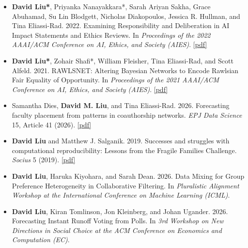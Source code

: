 \documentclass[margin]{res}
\begin{document}
\begin{resume}
\begin{itemize}
\item[]
\textbf{David Liu*}, Priyanka Nanayakkara*, Sarah Ariyan Sakha, Grace Abuhamad, Su Lin Blodgett, Nicholas Diakopoulos, Jessica R. Hullman, and Tina Eliassi-Rad. 2022. Examining Responsibility and Deliberation in AI Impact Statements and Ethics Reviews. In \textit{Proceedings of the 2022 AAAI/ACM Conference on AI, Ethics, and Society (AIES)}. \href{https://dl.acm.org/doi/10.1145/3514094.3534155}{[pdf]}
\item[] 
\textbf{David Liu*}, Zohair Shafi*, William Fleisher, Tina Eliassi-Rad, and Scott Alfeld. 2021. RAWLSNET: Altering Bayesian Networks to Encode Rawlsian Fair Equality of Opportunity. In \textit{Proceedings of the 2021 AAAI/ACM Conference on AI, Ethics, and Society (AIES)}. \href{https://doi.org/10.1145/3461702.3462618}{[pdf]}
\end{itemize}

\begin{itemize}
\section{Journal\\Papers}
\setlength{\itemsep}{14pt}
\setlength{\parsep}{0pt}
\item[]
Samantha Dies, \textbf{David M. Liu}, and Tina Eliassi-Rad. 2026. Forecasting faculty placement from patterns in coauthorship networks. \textit{EPJ Data Science} 15, Article 41 (2026). \href{https://arxiv.org/pdf/2507.14696}{[pdf]}
\item[]
\textbf{David Liu} and Matthew J. Salganik. 2019. Successes and struggles with computational reproducibility: Lessons from the Fragile Families Challenge. \textit{Socius} 5 (2019).  \href{https://doi.org/10.1177/2378023119849803}{[pdf]}
\end{itemize}

\begin{itemize}
\section{Workshop\\Papers}
\setlength{\itemsep}{14pt}
\setlength{\parsep}{0pt}
\item[]
\textbf{David Liu}, Haruka Kiyohara, and Sarah Dean. 2026. Data Mixing for Group Preference Heterogeneity in Collaborative Filtering. In \textit{Pluralistic Alignment Workshop at the International Conference on Machine Learning (ICML)}.
\item[]
\textbf{David Liu}, Kiran Tomlinson, Jon Kleinberg, and Johan Ugander. 2026. Forecasting Instant Runoff Voting from Polls. In \textit{3rd Workshop on New Directions in Social Choice at the ACM Conference on Economics and Computation (EC)}.
\end{itemize}


\end{resume}
\end{document}
